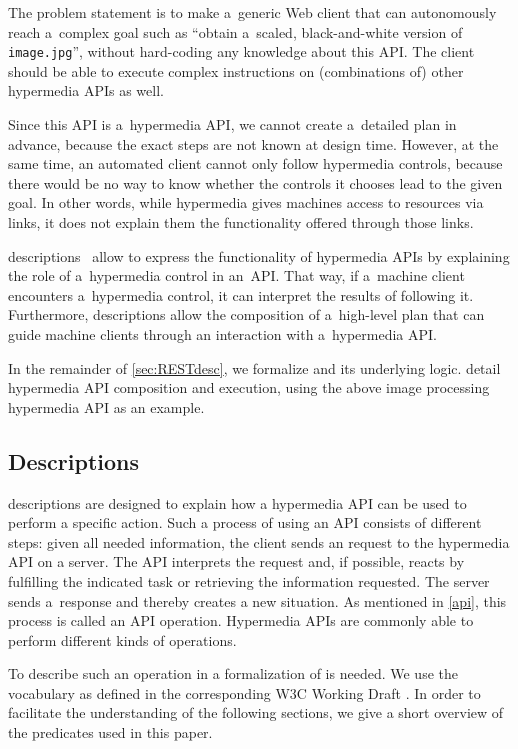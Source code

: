 The problem statement is to make a~generic Web client
that can autonomously reach a~complex goal such as
``obtain a~scaled, black-and-white version of \verb!image.jpg!'',
without hard-coding any knowledge about this API.
The client should be able to execute complex instructions
on (combinations of) other hypermedia APIs as well.

Since this API is a~hypermedia API,
we cannot create a~detailed plan in advance,
because the exact steps are not known at design time.
However, at the same time,
an automated client cannot only follow hypermedia controls,
because there would be no way to know
whether the controls it chooses lead to the given goal.
In other words,
while hypermedia gives machines access to resources via links,
it does not explain them the functionality offered through those links.

\restdesc descriptions~\cite{verborgh_wsrest_2012,verborgh_mtap_2013}
allow to express the functionality of hypermedia APIs
by explaining the role of a~hypermedia control in an~API.
That way, if a~machine client encounters a~hypermedia control,
it can interpret the results of following it.
Furthermore, \restdesc descriptions allow the composition of a~high-level plan
that can guide machine clients through an interaction with a~hypermedia API.

In the remainder of \cref{sec:RESTdesc},
we formalize \restdesc and its underlying \nthree logic.
 detail hypermedia API composition and execution,
using the above image processing hypermedia API as an example.




\subsection{\restdesc Descriptions}\label{rd}

\restdesc descriptions are designed to explain how a hypermedia API can be used to perform a specific action. 
Such a process of using an API consists of different steps:
given all needed information, the client sends an \http request to the hypermedia API on a server.
The API interprets the request and,
if possible, reacts by fulfilling the indicated task
or retrieving the information requested. The server sends a~response and thereby creates a new situation. As mentioned in \cref{api}, this process 
is called an API operation.
Hypermedia APIs are commonly able to perform different kinds of operations.

To describe such an operation in \nthree
a formalization of \http
is needed. 
We use the \rdf vocabulary as defined in the corresponding W3C Working Draft \cite{httprdf}.
In order to facilitate the understanding of the following sections, we give a short overview of the \http predicates used in this paper.


